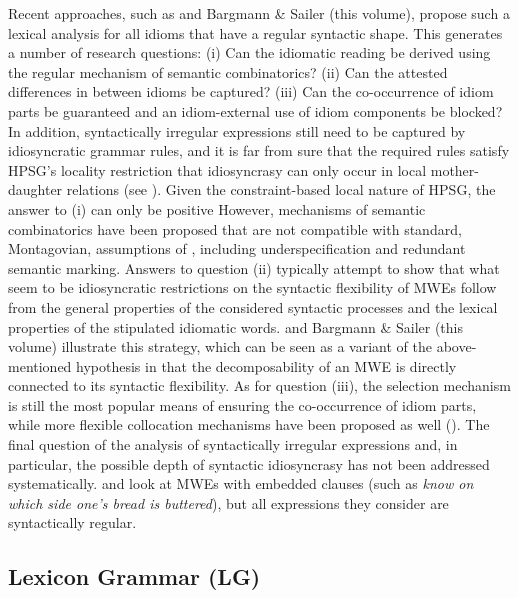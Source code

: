 \documentclass[output=paper]{langsci/langscibook}
\begin{document}
Recent approaches, such as \citet{kaysagidioms} and Bargmann \& Sailer (this volume), propose such a lexical analysis for all idioms that have a regular syntactic shape. This generates a number of research questions: (i) Can the idiomatic reading be derived using the regular mechanism of semantic combinatorics? (ii) Can the attested differences in  between idioms be captured? (iii) Can the co-occurrence of idiom parts be guaranteed and an idiom-external use of idiom components be blocked? In addition, syntactically irregular expressions still need to be captured by idiosyncratic grammar rules, and it is far from sure that the required rules satisfy HPSG’s locality restriction that idiosyncrasy can only occur in local mother-daughter relations (see \citealt{Sailer:12}).
Given the constraint-based local nature of HPSG, the answer to (i) can only be positive However, mechanisms of semantic combinatorics have been proposed that are not compatible with standard,   Montagovian, assumptions of , including underspecification and redundant semantic marking. Answers to question (ii) typically attempt to show that what seem to be idiosyncratic restrictions on the syntactic flexibility of MWEs follow from the general properties of the considered syntactic processes and the lexical properties of the stipulated idiomatic words. \citet{kaysagidioms} and Bargmann \& Sailer (this volume) illustrate this strategy, which can be seen as a variant of the above-mentioned hypothesis in \citet{Nunberg1994}  that the decomposability of an MWE is directly connected to its syntactic flexibility. As for question (iii), the selection mechanism is still the most popular means of ensuring the co-occurrence of idiom parts, while more flexible collocation mechanisms have been proposed as well (\citealt{Sailer:03, Soehn:09}). The final question of the analysis of syntactically irregular expressions and, in particular, the possible depth of syntactic idiosyncrasy has not been addressed systematically. \citet{Richter:Sailer:14} and \citet{kaysagidioms} look at MWEs with embedded clauses (such as \textit{know on which side one’s bread is buttered}), but all expressions they consider are syntactically regular. 


\subsection{Lexicon Grammar (LG)}\label{Sec-LG} 
\end{document}
